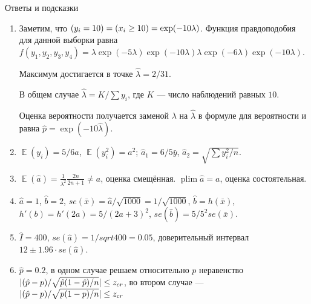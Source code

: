 \documentclass[12pt]{article}
\let\P\relax
\DeclareMathOperator{\P}{\mathbb{P}}
\DeclarePairedDelimiter{\abs}{\lvert}{\rvert}
\DeclareMathOperator{\plim}{plim}
\DeclareMathOperator{\E}{\mathbb{E}}
\begin{document}
Ответы и подсказки
\begin{enumerate}

    \item Заметим, что $\P(y_i = 10) = \P(x_i \geq 10) = \exp(-10 \lambda)$.
    Функция правдоподобия для данной выборки равна $f(y_1, y_2, y_3, y_4) = \lambda \exp(-5\lambda)\exp(-10\lambda)\lambda\exp(-6\lambda)\exp(-10\lambda)$.

    Максимум достигается в точке $\hat\lambda = 2/31$.

    В общем случае $\hat\lambda = K/\sum y_i$, где $K$ — число наблюдений равных $10$.

    Оценка вероятности получается заменой $\lambda$ на $\hat\lambda$ в формуле для вероятности и  равна $\hat p = \exp(-10\hat\lambda)$.

    \item $\E(y_i) = 5/6a$, $\E(y_i^2) = a^2$; $\hat a_1 = 6/5 \bar y$, $\hat a_2 = \sqrt{\sum y_i^2 /n}$.
    
    \item $\E(\hat a) = \frac{1}{\lambda^2} \frac{2n}{2n+1} \neq a$, оценка смещённая.
    $\plim \hat a= a$, оценка состоятельная. 
    \item $\hat a = 1$, $\hat b = 2$, $se(\bar x) = \hat a/\sqrt{1000} = 1/\sqrt{1000}$, $\hat b = h(\bar x)$, 
    $h'(b) = h'(2a) = 5/(2a+3)^2$, $se(\hat b) = 5/5^2 se(\bar x)$.
    
    \item $\hat I = 400$, $se(\hat a) = 1/sqrt{400} = 0.05$, доверительный интервал $12 \pm 1.96 \cdot se(\hat a)$.
    \item $\hat p = 0.2$, в одном случае решаем относительно $p$ неравенство $\abs{(\hat p - p) / \sqrt{\hat p (1 - \hat p)/n}} \leq z_{cr}$,
    во втором случае — $\abs{(\hat p - p) / \sqrt{p (1 - p)/n}} \leq z_{cr}$


\end{enumerate}
\end{document}
